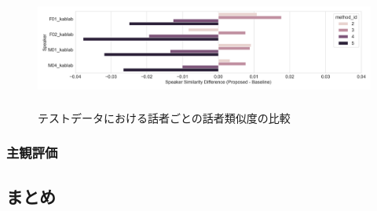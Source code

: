 \documentclass[12pt]{jarticle}
\numberwithin{equation}{section}    %
\numberwithin{figure}{section}      %
\numberwithin{table}{section}      %
\begin{document}
\begin{figure}[bt]
    \centering
    \includegraphics[height=40mm]{./figure/sec4/obj_metrics/spk_sim_speaker_wise_comparison.png}
    \caption{テストデータにおける話者ごとの話者類似度の比較}
    \label{sec4:fig:spk_sim_speaker_wise_comparison}
\end{figure}

\clearpage

\subsubsection{主観評価}

\clearpage

\subsection{まとめ}

\clearpage


\end{document}
